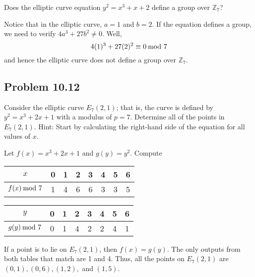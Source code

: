 \documentclass[../hw_sols.tex]{subfiles}
\begin{document}
Does the elliptic curve equation $y^2 = x^3 + x + 2$ define a group over 
$\mathbb{Z}_7$?

\begin{solution}
Notice that in the elliptic curve, $a = 1$ and $b = 2$. If the equation 
defines a group, we need to verify $4a^3 + 27b^2 \neq 0$. Well,
	\[ 4(1)^3 + 27(2)^2 \equiv 0 \tmod{7} \]
and hence the elliptic curve does not define a group over $\mathbb{Z}_7$.
\end{solution}



\subsection*{Problem 10.12}

Consider the elliptic curve $E_7(2,1)$; that is, the curve is defined by 
$y^2 = x^3 + 2x + 1$ with a modulus of $p = 7$. Determine all of the points 
in $E_7(2, 1)$. Hint: Start by calculating the right-hand side of the 
equation for all values of $x$.

\begin{solution}
Let $f(x) = x^3 + 2x + 1$ and $g(y) = y^2$. Compute 

\begin{minipage}{0.45\textwidth}
\centering
\begin{tabular}{ c | *{7}{c} }
				$x$ & 0 & 1 & 2 & 3 & 4 & 5 & 6 \\ \hline
	$f(x) \tmod{7}$ & 1 & 4 & 6 & 6 & 3 & 3 & 5
\end{tabular}
\end{minipage}
\begin{minipage}{0.5\textwidth}
\centering
\begin{tabular}{ c | *{7}{c} }
				$y$ & 0 & 1 & 2 & 3 & 4 & 5 & 6 \\ \hline
	$g(y) \tmod{7}$ & 0 & 1 & 4 & 2 & 2 & 4 & 1
\end{tabular}
\end{minipage}

If a point is to lie on $E_7(2,1)$, then $f(x) = g(y)$. The only outputs from 
both tables that match are 1 and 4. Thus, all the points on $E_7(2,1)$ are 
$(0,1), (0,6), (1,2),$ and $(1,5)$.
\end{solution}
\end{document}
